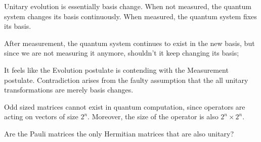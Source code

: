 \documentclass{article}
\newcommand{\0}{{$|0\rangle$}}
\newcommand{\1}{{$|1\rangle$}}
\begin{document}
Unitary evolution is essentially basis change. When not measured, the quantum system changes its basis continuously. When measured, the quantum system fixes its basis. 

After measurement, the quantum system continues to exist in the new basis, but since we are not measuring it anymore, shouldn't it keep changing its basis; 

It feels like the Evolution postulate is contending with the Measurement postulate. Contradiction arises from the faulty assumption that the all unitary transformations are merely basis changes.


Odd sized matrices cannot exist in quantum computation, since operators are acting on vectors of size $2^n$. Moreover, the size of the operator is also $2^n \times 2^n$.

Are the Pauli matrices the only Hermitian matrices that are also unitary?
\end{document}
